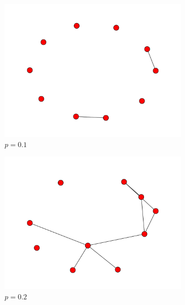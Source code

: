 \documentclass[10pt,a4paper]{scrartcl}
\begin{document}
\begin{figure}[H]
\begin{center}
        \begin{subfigure}[b]{0.45\textwidth}
                \includegraphics[width=\textwidth]{figures/ER_graph_1.pdf}
                \caption{$p=0.1$}
        \end{subfigure}
	 \begin{subfigure}[b]{0.45\textwidth}
                \includegraphics[width=\textwidth]{figures/ER_graph_2.pdf}
                \caption{$p=0.2$}
        \end{subfigure}
	 \begin{subfigure}[b]{0.45\textwidth}

\end{subfigure}
\end{center}
\end{figure}
\end{document}
